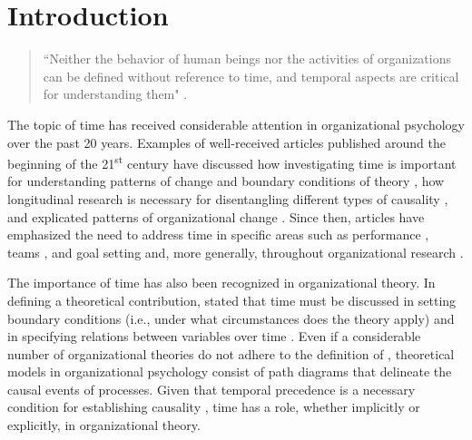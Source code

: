 \documentclass[
12pt, %
twoside,
english]{guelphthesis}
\let\cleardoublepage\clearpage
\newcommand{\setMainMatterLinespacing}{
 \setstretch{2} %

        \setstretch{2}
  }
\let\oldmainmatter\mainmatter
\renewcommand{\mainmatter}{
  \oldmainmatter

  \setMainMatterLinespacing

  
  \pagestyle{mainmatter} %

}
\newcommand{\listappname}{List of Appendices}
\begin{document}
  \cleardoublepage
  \listoffigures
  \newpage


  \cleardoublepage
  \addcontentsline{toc}{chapter}{\listappname}
  \listofapp

  \newpage


\mainmatter %

\nocite{R-tidyverse, R-nonlinSims, R-nonlinSimsAnalysis, R-devtools, R-RColorBrewer, R-cowplot, R-data.table, R-egg, R-ggbrace, R-ggtext, R-kableExtra, R-knitr}

\hypertarget{introduction}{%
\chapter{Introduction}\label{introduction}}
\begin{quote}
    ``Neither the behavior of human beings nor the activities of organizations can be defined without reference to time, and temporal aspects are critical for understanding them" \parencite[][p. 136]{navarro2015}.
\end{quote}
The topic of time has received considerable attention in organizational psychology over the past 20 years. Examples of well-received articles published around the beginning of the 21\textsuperscript{st} century have discussed how investigating time is important for
understanding patterns of change and boundary conditions of theory
\autocite{zaheer1999}, how longitudinal research is necessary for disentangling
different types of causality \autocite{mitchell2001}, and explicated patterns
of organizational change \autocite[or institutionalization;][]{lawrence2001}.
Since then, articles have emphasized the need to address time in
specific areas such as performance \autocite{fisher2008,dalal2014}, teams \autocite{roe2012}, and goal setting \autocite{fried2004} and, more generally, throughout organizational research \autocite{george2000,roe2008,ployhart2010,sonnentag2012,navarro2015,shipp2015,kunisch2017,vantilborgh2018,aguinis2021}.

The importance of time has also been recognized in organizational theory. In defining a theoretical contribution, \textcite{whetten1989} stated that time must be discussed in setting boundary conditions (i.e., under what circumstances does the theory apply) and in specifying relations between variables over time \autocite{mitchell2001,george2000}. Even if a considerable number of organizational theories do not adhere to the definition of \textcite{whetten1989}, theoretical models in organizational psychology consist of path diagrams that delineate the causal events of processes. Given that temporal precedence is a necessary condition for establishing causality \autocite{mill2011}, time has a role, whether implicitly or explicitly, in organizational theory.
\end{document}
